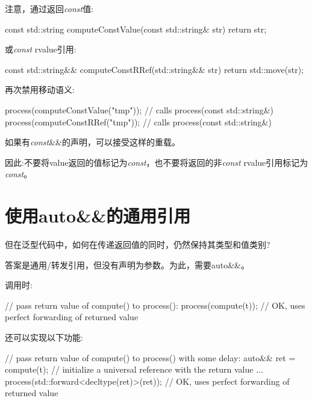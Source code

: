 注意，通过返回\textit{const}值:\par

\begin{codebox}[cpp]
const std::string computeConstValue(const std::string& str) {
  return str;
}
\end{codebox}

或\textit{const} rvalue引用:\par

\begin{codebox}[cpp]
const std::string&& computeConstRRef(std::string&& str) {
  return std::move(str);
}
\end{codebox}

再次禁用移动语义:\par

\begin{codebox}[cpp]
process(computeConstValue("tmp")); // calls process(const std::string&)
process(computeConstRRef("tmp")); // calls process(const std::string&)
\end{codebox}

如果有\textit{const}\&\&的声明，可以接受这样的重载。\par

因此:不要将value返回的值标记为\textit{const}，也不要将返回的非\textit{const} rvalue引用标记为\textit{const}。\par


\section{使用auto\&\&的通用引用}

但在泛型代码中，如何在传递返回值的同时，仍然保持其类型和值类别?\par

答案是通用/转发引用，但没有声明为参数。为此，需要auto\&\&。\par

调用时:\par

\begin{codebox}[cpp]
// pass return value of compute() to process():
process(compute(t)); // OK, uses perfect forwarding of returned value
\end{codebox}

还可以实现以下功能:\par

\begin{codebox}[cpp]
// pass return value of compute() to process() with some delay:
auto&& ret = compute(t); // initialize a universal reference with the return value
...
process(std::forward<decltype(ret)>(ret)); // OK, uses perfect forwarding of returned value
\end{codebox}

